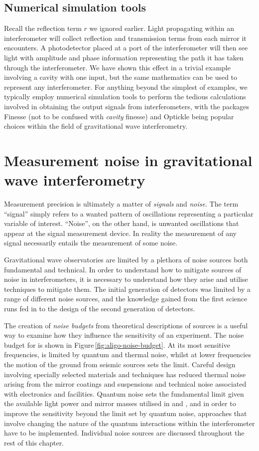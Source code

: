 \subsection{Numerical simulation tools}
Recall the reflection term $r$ we ignored earlier. Light propagating within an interferometer will collect reflection and transmission terms from each mirror it encounters. A photodetector placed at a port of the interferometer will then see light with amplitude and phase information representing the path it has taken through the interferometer. We have shown this effect in a trivial example involving a \FP{} cavity with one input, but the same mathematics can be used to represent any interferometer. For anything beyond the simplest of examples, we typically employ numerical simulation tools to perform the tedious calculations involved in obtaining the output signals from interferometers, with the packages Finesse \cite{Freise2004} (not to be confused with \emph{cavity} finesse) and Optickle \cite{Evans2012} being popular choices within the field of gravitational wave interferometry.

\section{\label{sec:ifo-noise}Measurement noise in gravitational wave interferometry}
Measurement precision is ultimately a matter of \emph{signals} and \emph{noise}. The term ``signal'' simply refers to a wanted pattern of oscillations representing a particular variable of interest. ``Noise'', on the other hand, is unwanted oscillations that appear at the signal measurement device. In reality the measurement of any signal necessarily entails the measurement of some noise.

Gravitational wave observatories are limited by a plethora of noise sources both fundamental and technical. In order to understand how to mitigate sources of noise in interferometers, it is necessary to understand how they arise and utilise techniques to mitigate them. The initial generation of detectors was limited by a range of different noise sources, and the knowledge gained from the first science runs fed in to the design of the second generation of detectors.

The creation of \emph{noise budgets} from theoretical descriptions of sources is a useful way to examine how they influence the sensitivity of an experiment. The noise budget for \ALIGO{} is shown in Figure\,\ref{fig:aligo-noise-budget}. At its most sensitive frequencies, \ALIGO{} is limited by quantum and thermal noise, whilst at lower frequencies the motion of the ground from seismic sources sets the limit. Careful design involving specially selected materials and techniques has reduced thermal noise arising from the mirror coatings and suspensions and technical noise associated with electronics and facilities. Quantum noise sets the fundamental limit given the available light power and mirror masses utilised in \ALIGO{} and \AVIRGO{}, and in order to improve the sensitivity beyond the limit set by quantum noise, approaches that involve changing the nature of the quantum interactions within the interferometer have to be implemented. Individual noise sources are discussed throughout the rest of this chapter.


